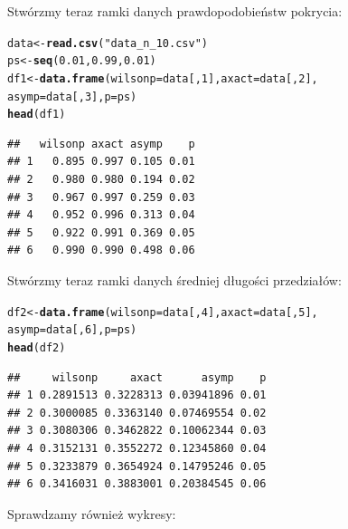 \documentclass[12pt]{mwart}\usepackage[]{graphicx}\usepackage[]{color}
\makeatletter
\newcommand{\hlnum}[1]{\textcolor[rgb]{0.686,0.059,0.569}{#1}}%
\newcommand{\hlstr}[1]{\textcolor[rgb]{0.192,0.494,0.8}{#1}}%
\newcommand{\hlstd}[1]{\textcolor[rgb]{0.345,0.345,0.345}{#1}}%
\newcommand{\hlkwb}[1]{\textcolor[rgb]{0.69,0.353,0.396}{#1}}%
\newcommand{\hlkwc}[1]{\textcolor[rgb]{0.333,0.667,0.333}{#1}}%
\newcommand{\hlkwd}[1]{\textcolor[rgb]{0.737,0.353,0.396}{\textbf{#1}}}%
\newenvironment{kframe}{%
 \def\at@end@of@kframe{}%
 \ifinner\ifhmode%
  \def\at@end@of@kframe{\end{minipage}}%
  \begin{minipage}{\columnwidth}%
 \fi\fi%
 \def\FrameCommand##1{\hskip\@totalleftmargin \hskip-\fboxsep
 \colorbox{shadecolor}{##1}\hskip-\fboxsep
     \hskip-\linewidth \hskip-\@totalleftmargin \hskip\columnwidth}%
 \MakeFramed {\advance\hsize-\width
   \@totalleftmargin\z@ \linewidth\hsize
   \@setminipage}}%
 {\par\unskip\endMakeFramed%
 \at@end@of@kframe}
\newenvironment{knitrout}{}{} %
\makeatother
\begin{document}
Stwórzmy teraz ramki danych prawdopodobieństw pokrycia:
\begin{knitrout}
\color{fgcolor}\begin{kframe}
\begin{alltt}
\hlstd{data} \hlkwb{<-} \hlkwd{read.csv}\hlstd{(}\hlstr{"data_n_10.csv"}\hlstd{)}
\hlstd{ps} \hlkwb{<-} \hlkwd{seq}\hlstd{(}\hlnum{0.01}\hlstd{,} \hlnum{0.99}\hlstd{,} \hlnum{0.01}\hlstd{)}
\hlstd{df1} \hlkwb{<-} \hlkwd{data.frame}\hlstd{(}\hlkwc{wilsonp} \hlstd{= data[,}\hlnum{1}\hlstd{],} \hlkwc{axact} \hlstd{= data[,}\hlnum{2}\hlstd{],}
                    \hlkwc{asymp} \hlstd{= data[,}\hlnum{3}\hlstd{],} \hlkwc{p} \hlstd{= ps)}
\hlkwd{head}\hlstd{(df1)}
\end{alltt}
\begin{verbatim}
##   wilsonp axact asymp    p
## 1   0.895 0.997 0.105 0.01
## 2   0.980 0.980 0.194 0.02
## 3   0.967 0.997 0.259 0.03
## 4   0.952 0.996 0.313 0.04
## 5   0.922 0.991 0.369 0.05
## 6   0.990 0.990 0.498 0.06
\end{verbatim}
\end{kframe}
\end{knitrout}
Stwórzmy teraz ramki danych średniej długości przedziałów:
\begin{knitrout}
\color{fgcolor}\begin{kframe}
\begin{alltt}
\hlstd{df2} \hlkwb{<-} \hlkwd{data.frame}\hlstd{(}\hlkwc{wilsonp} \hlstd{= data[,}\hlnum{4}\hlstd{],} \hlkwc{axact} \hlstd{= data[,}\hlnum{5}\hlstd{],}
                    \hlkwc{asymp} \hlstd{= data[,}\hlnum{6}\hlstd{],} \hlkwc{p} \hlstd{= ps)}
\hlkwd{head}\hlstd{(df2)}
\end{alltt}
\begin{verbatim}
##     wilsonp     axact      asymp    p
## 1 0.2891513 0.3228313 0.03941896 0.01
## 2 0.3000085 0.3363140 0.07469554 0.02
## 3 0.3080306 0.3462822 0.10062344 0.03
## 4 0.3152131 0.3552272 0.12345860 0.04
## 5 0.3233879 0.3654924 0.14795246 0.05
## 6 0.3416031 0.3883001 0.20384545 0.06
\end{verbatim}
\end{kframe}
\end{knitrout}
Sprawdzamy również wykresy:
\end{document}
